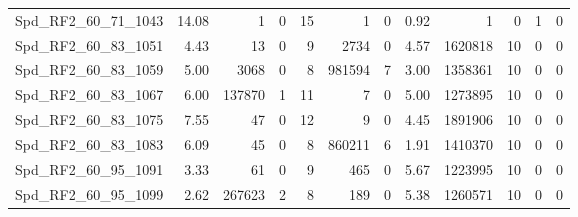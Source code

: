 \begin{longtable}[c]{@{}lrrrrrrrrrrr@{}}
Spd\_RF2\_60\_71\_1043        & 14.08                  & 1                       & 0                       & 15                     & 1                       & 0                       & 0.92                    & 1                        & 0                        & 1                        & 0                        \\
Spd\_RF2\_60\_83\_1051        & 4.43                   & 13                      & 0                       & 9                      & 2734                    & 0                       & 4.57                    & 1620818                  & 10                       & 0                        & 0                        \\
Spd\_RF2\_60\_83\_1059        & 5.00                   & 3068                    & 0                       & 8                      & 981594                  & 7                       & 3.00                    & 1358361                  & 10                       & 0                        & 0                        \\
Spd\_RF2\_60\_83\_1067        & 6.00                   & 137870                  & 1                       & 11                     & 7                       & 0                       & 5.00                    & 1273895                  & 10                       & 0                        & 0                        \\
Spd\_RF2\_60\_83\_1075        & 7.55                   & 47                      & 0                       & 12                     & 9                       & 0                       & 4.45                    & 1891906                  & 10                       & 0                        & 0                        \\
Spd\_RF2\_60\_83\_1083        & 6.09                   & 45                      & 0                       & 8                      & 860211                  & 6                       & 1.91                    & 1410370                  & 10                       & 0                        & 0                        \\
Spd\_RF2\_60\_95\_1091        & 3.33                   & 61                      & 0                       & 9                      & 465                     & 0                       & 5.67                    & 1223995                  & 10                       & 0                        & 0                        \\
Spd\_RF2\_60\_95\_1099        & 2.62                   & 267623                  & 2                       & 8                      & 189                     & 0                       & 5.38                    & 1260571                  & 10                       & 0                        & 0                        \\

\end{longtable}
